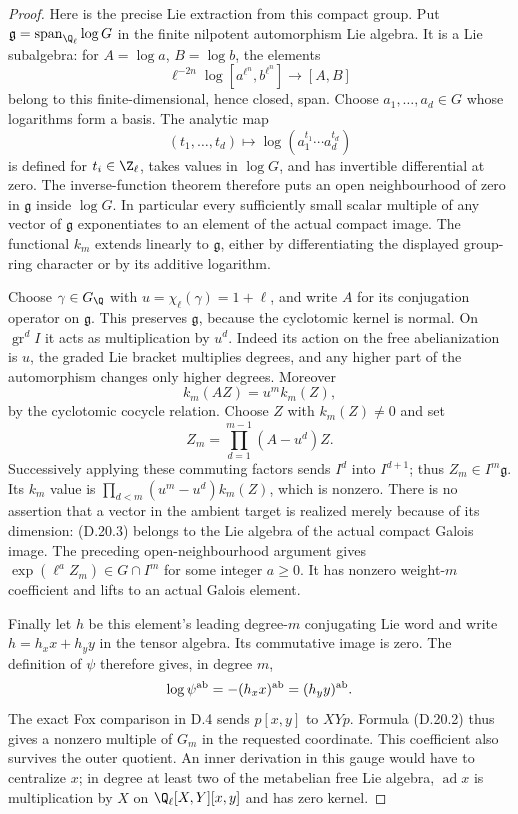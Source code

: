 \begin{proof}
Here is the precise Lie extraction from this compact
group. Put $\mathfrak g=\operatorname{span}_{\Q_\ell}\log G$
in the finite nilpotent automorphism Lie algebra. It is
a Lie subalgebra: for $A=\log a$, $B=\log b$, the elements
\[
 \ell^{-2n}\log[a^{\ell^n},b^{\ell^n}]
                       \longrightarrow[A,B]
\]
belong to this finite-dimensional, hence closed, span.
Choose $a_1,\ldots,a_d\in G$ whose logarithms form a
basis. The analytic map
\[
 (t_1,\ldots,t_d)\longmapsto
       \log(a_1^{t_1}\cdots a_d^{t_d})
\]
is defined for $t_i\in\Z_\ell$, takes values in
$\log G$, and has invertible differential at zero.
The inverse-function theorem therefore puts an open
neighbourhood of zero in $\mathfrak g$ inside $\log G$.
In particular every sufficiently small scalar multiple
of any vector of $\mathfrak g$ exponentiates to an
element of the actual compact image. The functional
$k_m$ extends linearly to $\mathfrak g$, either by
differentiating the displayed group-ring character or
by its additive logarithm.

Choose $\gamma\in G_\Q$ with
$u=\chi_\ell(\gamma)=1+\ell$, and write $A$ for its
conjugation operator on $\mathfrak g$. This preserves
$\mathfrak g$, because the cyclotomic kernel is normal.
On $\operatorname{gr}^d I$ it acts as multiplication by
$u^d$. Indeed its action on the free abelianization is
$u$, the graded Lie bracket multiplies degrees, and
any higher part of the automorphism changes only
higher degrees. Moreover
\[
                  k_m(AZ)=u^m k_m(Z),
\]
by the cyclotomic cocycle relation. Choose $Z$ with
$k_m(Z)\ne0$ and set
\[
                 Z_m=\prod_{d=1}^{m-1}(A-u^d)Z.
 \tag{D.20.3}
\]
Successively applying these commuting factors sends
$I^d$ into $I^{d+1}$; thus $Z_m\in I^m\mathfrak g$.
Its $k_m$ value is
$\prod_{d<m}(u^m-u^d)k_m(Z)$, which is nonzero.
There is no assertion that a vector in the ambient
target is realized merely because of its dimension:
(D.20.3) belongs to the Lie algebra of the actual
compact Galois image. The preceding open-neighbourhood
argument gives $\exp(\ell^a Z_m)\in G\cap I^m$ for
some integer $a\ge0$. It has nonzero weight-$m$
coefficient and lifts to an actual Galois element.

Finally let $h$ be this element's leading degree-$m$
conjugating Lie word and write $h=h_xx+h_yy$ in the
tensor algebra. Its commutative image is zero. The
definition of $\psi$ therefore gives, in degree $m$,
\[
 \log\psi^{\rm ab}=-(h_xx)^{\rm ab}
                      =(h_yy)^{\rm ab}.
\]
The exact Fox comparison in D.4 sends $p[x,y]$ to
$XYp$. Formula (D.20.2) thus gives a nonzero multiple
of $G_m$ in the requested coordinate. This coefficient
also survives the outer quotient. An inner derivation
in this gauge would have to centralize $x$; in degree
at least two of the metabelian free Lie algebra,
$\operatorname{ad}x$ is multiplication by $X$ on
$\Q_\ell[X,Y][x,y]$ and has zero kernel.


\end{proof}
